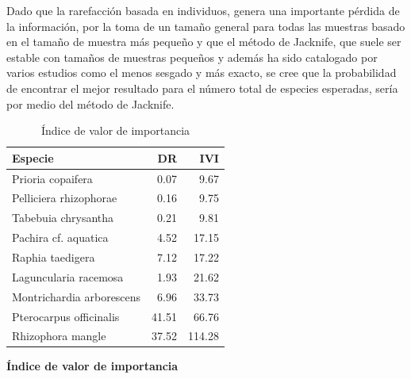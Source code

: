 \documentclass[conference,final,12pt,]{IEEEtran}
\begin{document}
Dado que la rarefacción basada en individuos, genera
una importante pérdida de la información, por la toma de un tamaño
general para todas las muestras basado en el tamaño de muestra más
pequeño\citep{AQ} y que el método de Jacknife, que suele ser estable con
tamaños de muestras pequeños \citep{AS} y además ha sido catalogado por
varios estudios \cite{AS,AT,AU} como el menos sesgado y
más exacto, se cree que la probabilidad de encontrar el mejor resultado
para el número total de especies esperadas, sería por medio del método de
Jacknife.

\begin{table}[htb]

\caption{\label{tab:unnamed-chunk-7}Índice de valor de importancia}
\centering
\begin{tabular}[t]{l|r|r}
\hline
Especie & DR & IVI\\
\hline
Prioria copaifera & 0.07 & 9.67\\
\hline
Pelliciera rhizophorae & 0.16 & 9.75\\
\hline
Tabebuia chrysantha & 0.21 & 9.81\\
\hline
Pachira cf. aquatica & 4.52 & 17.15\\
\hline
Raphia taedigera & 7.12 & 17.22\\
\hline
Laguncularia racemosa & 1.93 & 21.62\\
\hline
Montrichardia arborescens & 6.96 & 33.73\\
\hline
Pterocarpus officinalis & 41.51 & 66.76\\
\hline
Rhizophora mangle & 37.52 & 114.28\\
\hline
\end{tabular}
\end{table}

\textbf{Índice de valor de importancia}
\end{document}
